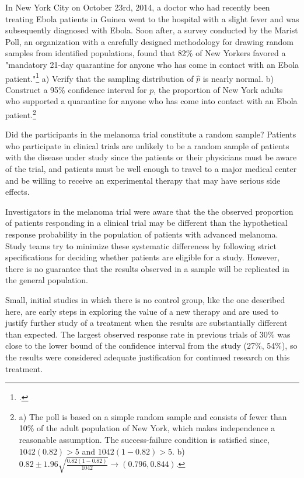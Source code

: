 \begin{exercise}
	In New York City on October 23rd, 2014, a doctor who had recently been treating Ebola patients in Guinea went to the hospital with a slight fever and was subsequently diagnosed with Ebola. Soon after, a survey conducted by the Marist Poll, an organization with a carefully designed methodology for drawing random samples from identified populations, found that 82\% of New Yorkers favored a "mandatory 21-day quarantine for anyone who has come in contact with an Ebola patient."\footnote{.} a) Verify that the sampling distribution of $\hat{p}$ is nearly normal. b) Construct a 95\% confidence interval for $p$, the proportion of New York adults who supported a quarantine for anyone who has come into contact with an Ebola patient.\footnote{a) The poll is based on a simple random sample and consists of fewer than 10\% of the adult population of New York, which makes independence a reasonable assumption. The success-failure condition is satisfied since, $1042(0.82) > 5$ and $1042(1-0.82) > 5$. b) $0.82 \pm 1.96\sqrt{\frac{0.82(1-0.82)}{1042}} \rightarrow (0.796, 0.844)$. }
\end{exercise}

Did the participants in the melanoma trial constitute a random sample?  Patients who participate in clinical trials are unlikely to be a random sample of patients with the disease under study since the patients or their physicians must be aware of the trial, and patients must be well enough to travel to a major medical center and be willing to receive an experimental therapy that may have serious side effects.  

Investigators in the melanoma trial were aware that the the observed proportion of patients responding in a clinical trial may be different than the hypothetical response probability in the population of patients with advanced melanoma. Study teams try to minimize these systematic differences by following strict specifications for deciding whether patients are eligible for a study. However, there is no guarantee that the results observed in a sample will be replicated in the general population.

Small, initial studies in which there is no control group, like the one described here, are early steps in exploring the value of a new therapy and are used to justify further study of a treatment when the results are substantially different than expected.  The largest observed response rate in previous trials of 30\% was close to the lower bound of the confidence interval from the study (27\%, 54\%), so the results were considered adequate justification for continued research on this treatment.

